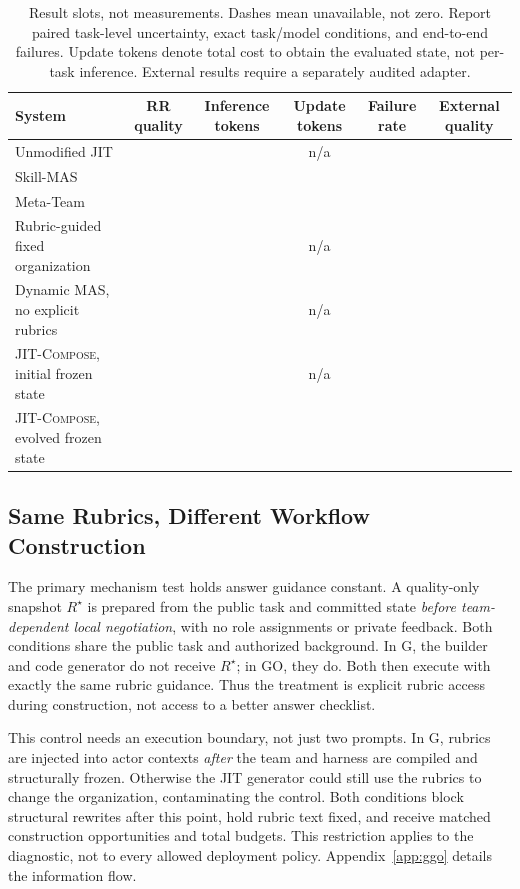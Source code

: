 \documentclass[11pt]{article}
\newcommand{\method}{\mbox{\textsc{JIT-Compose}}}
\newcommand{\na}{\textemdash}
\begin{document}
\begin{table}[t]
\centering\small
\begin{tabularx}{\textwidth}{@{}Xccccc@{}}
\toprule
System & RR quality & Inference tokens & Update tokens & Failure rate & External quality \\
\midrule
Unmodified JIT & \na & \na & n/a & \na & \na \\
Skill-MAS & \na & \na & \na & \na & \na \\
Meta-Team & \na & \na & \na & \na & \na \\
Rubric-guided fixed organization & \na & \na & n/a & \na & \na \\
Dynamic MAS, no explicit rubrics & \na & \na & n/a & \na & \na \\
\method, initial frozen state & \na & \na & n/a & \na & \na \\
\method, evolved frozen state & \na & \na & \na & \na & \na \\
\bottomrule
\end{tabularx}
\caption{Result slots, not measurements. Dashes mean unavailable, not zero. Report paired task-level uncertainty, exact task/model conditions, and end-to-end failures. Update tokens denote total cost to obtain the evaluated state, not per-task inference. External results require a separately audited adapter.}
\label{tab:main}
\end{table}

\subsection{Same Rubrics, Different Workflow Construction}
\label{sec:guidance}

The primary mechanism test holds answer guidance constant. A quality-only snapshot $R^{\star}$ is prepared from the public task and committed state \emph{before team-dependent local negotiation}, with no role assignments or private feedback. Both conditions share the public task and authorized background. In G, the builder and code generator do not receive $R^{\star}$; in GO, they do. Both then execute with exactly the same rubric guidance. Thus the treatment is explicit rubric access during construction, not access to a better answer checklist.

This control needs an execution boundary, not just two prompts. In G, rubrics are injected into actor contexts \emph{after} the team and harness are compiled and structurally frozen. Otherwise the JIT generator could still use the rubrics to change the organization, contaminating the control. Both conditions block structural rewrites after this point, hold rubric text fixed, and receive matched construction opportunities and total budgets. This restriction applies to the diagnostic, not to every allowed deployment policy. Appendix~\ref{app:ggo} details the information flow.
\end{document}
